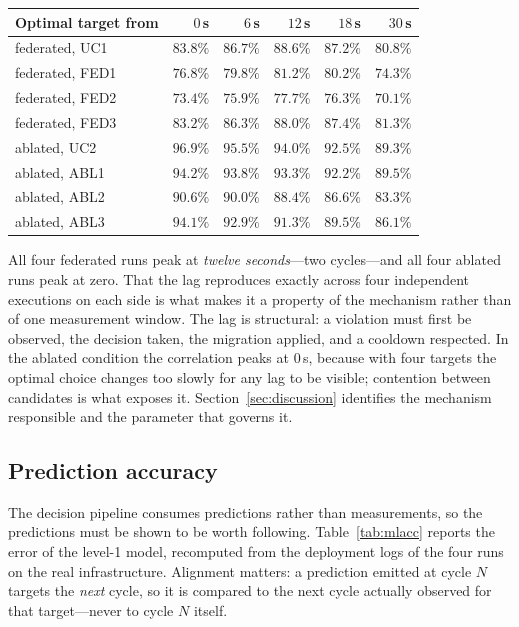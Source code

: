 \documentclass[conference]{IEEEtran}
\begin{document}
\begin{center}
\footnotesize
\setlength{\tabcolsep}{3.2pt}
\begin{tabular}{@{}lrrrrr@{}}
\toprule
Optimal target from & $0$\,s & $6$\,s & $12$\,s & $18$\,s & $30$\,s\\
\midrule
federated, UC1  & $83.8\%$ & $86.7\%$ & $\mathbf{88.6\%}$ & $87.2\%$ & $80.8\%$\\
federated, FED1 & $76.8\%$ & $79.8\%$ & $\mathbf{81.2\%}$ & $80.2\%$ & $74.3\%$\\
federated, FED2 & $73.4\%$ & $75.9\%$ & $\mathbf{77.7\%}$ & $76.3\%$ & $70.1\%$\\
federated, FED3 & $83.2\%$ & $86.3\%$ & $\mathbf{88.0\%}$ & $87.4\%$ & $81.3\%$\\
ablated, UC2    & $\mathbf{96.9\%}$ & $95.5\%$ & $94.0\%$ & $92.5\%$ & $89.3\%$\\
ablated, ABL1   & $\mathbf{94.2\%}$ & $93.8\%$ & $93.3\%$ & $92.2\%$ & $89.5\%$\\
ablated, ABL2   & $\mathbf{90.6\%}$ & $90.0\%$ & $88.4\%$ & $86.6\%$ & $83.3\%$\\
ablated, ABL3   & $\mathbf{94.1\%}$ & $92.9\%$ & $91.3\%$ & $89.5\%$ & $86.1\%$\\
\bottomrule
\end{tabular}
\end{center}

All four federated runs peak at \emph{twelve seconds}---two cycles---and all
four ablated runs peak at zero. That the lag reproduces exactly across four
independent executions on each side is what makes it a property of the
mechanism rather than of one measurement window. The lag is structural: a
violation must first be observed, the decision taken, the migration applied,
and a cooldown respected. In the ablated condition the correlation peaks at
$0$\,s, because with four targets the optimal choice changes too slowly for
any lag to be visible; contention between candidates is what exposes it.
Section~\ref{sec:discussion} identifies the mechanism responsible and the
parameter that governs it.

\subsection{Prediction accuracy}
\label{sec:mlacc}

The decision pipeline consumes predictions rather than measurements, so the
predictions must be shown to be worth following. Table~\ref{tab:mlacc}
reports the error of the level-1 model, recomputed from the deployment logs
of the four runs on the real infrastructure. Alignment matters: a prediction
emitted at cycle $N$ targets the \emph{next} cycle, so it is compared to the
next cycle actually observed for that target---never to cycle $N$ itself.
\end{document}
